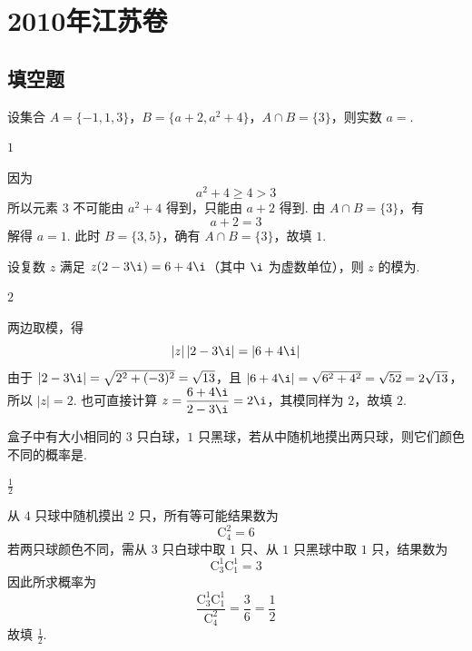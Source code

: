 \chapter{2010年江苏卷}

\section{填空题}

\begin{problem}
设集合 \(A=\{-1,1,3\}\)，\(B=\{a+2,a^2+4\}\)，\(A\cap B=\{3\}\)，则实数 \(a=\)\fillinblank{}.
\end{problem}

\begin{answer}
\(1\)
\end{answer}

\begin{solution}
因为
\[
a^2+4\geqslant4>3
\]
所以元素 \(3\) 不可能由 \(a^2+4\) 得到，只能由 \(a+2\) 得到. 由 \(A\cap B=\{3\}\)，有
\[
a+2=3
\]
解得 \(a=1\). 此时 \(B=\{3,5\}\)，确有 \(A\cap B=\{3\}\)，故填 \(1\).
\end{solution}

\begin{problem}
设复数 \(z\) 满足 \(z(2-3\i)=6+4\i\)（其中 \(\i\) 为虚数单位），则 \(z\) 的模为\fillinblank{}.
\end{problem}

\begin{answer}
\(2\)
\end{answer}

\begin{solution}
两边取模，得
\[
|z|\,|2-3\i|=|6+4\i|
\]
由于 \(|2-3\i|=\sqrt{2^2+(-3)^2}=\sqrt{13}\)，且
\(|6+4\i|=\sqrt{6^2+4^2}=\sqrt{52}=2\sqrt{13}\)，
所以 \(|z|=2\). 也可直接计算 \(z=\dfrac{6+4\i}{2-3\i}=2\i\)，其模同样为 \(2\)，故填 \(2\).
\end{solution}

\begin{problem}
盒子中有大小相同的 \(3\) 只白球，\(1\) 只黑球，若从中随机地摸出两只球，则它们颜色不同的概率是\fillinblank{}.
\end{problem}

\begin{answer}
\(\frac{1}{2}\)
\end{answer}

\begin{solution}
从 \(4\) 只球中随机摸出 \(2\) 只，所有等可能结果数为
\[
\mathrm C_4^2=6
\]
若两只球颜色不同，需从 \(3\) 只白球中取 \(1\) 只、从 \(1\) 只黑球中取 \(1\) 只，结果数为
\[
\mathrm C_3^1\mathrm C_1^1=3
\]
因此所求概率为
\[
\frac{\mathrm C_3^1\mathrm C_1^1}{\mathrm C_4^2}=\frac{3}{6}=\frac{1}{2}
\]
故填 \(\frac{1}{2}\).
\end{solution}

